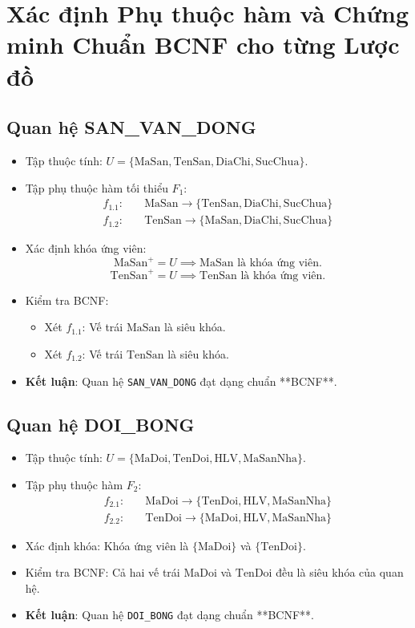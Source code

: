 \section{Xác định Phụ thuộc hàm và Chứng minh Chuẩn BCNF cho từng Lược đồ}

\subsection{Quan hệ SAN\_VAN\_DONG}
\begin{itemize}
    \item Tập thuộc tính: $U = \{\text{MaSan}, \text{TenSan}, \text{DiaChi}, \text{SucChua}\}$.
    \item Tập phụ thuộc hàm tối thiểu $F_1$:
    \begin{align*}
        f_{1.1}: & \quad \text{MaSan} \rightarrow \{\text{TenSan}, \text{DiaChi}, \text{SucChua}\} \\
        f_{1.2}: & \quad \text{TenSan} \rightarrow \{\text{MaSan}, \text{DiaChi}, \text{SucChua}\}
    \end{align*}
    \item Xác định khóa ứng viên:
    $$\text{MaSan}^+ = U \implies \text{MaSan} \text{ là khóa ứng viên.}$$
    $$\text{TenSan}^+ = U \implies \text{TenSan} \text{ là khóa ứng viên.}$$
    \item Kiểm tra BCNF:
    \begin{itemize}
        \item Xét $f_{1.1}$: Vế trái $\text{MaSan}$ là siêu khóa.
        \item Xét $f_{1.2}$: Vế trái $\text{TenSan}$ là siêu khóa.
    \end{itemize}
    \item \textbf{Kết luận}: Quan hệ \texttt{SAN\_VAN\_DONG} đạt dạng chuẩn **BCNF**.
\end{itemize}

\subsection{Quan hệ DOI\_BONG}
\begin{itemize}
    \item Tập thuộc tính: $U = \{\text{MaDoi}, \text{TenDoi}, \text{HLV}, \text{MaSanNha}\}$.
    \item Tập phụ thuộc hàm $F_2$:
    \begin{align*}
        f_{2.1}: & \quad \text{MaDoi} \rightarrow \{\text{TenDoi}, \text{HLV}, \text{MaSanNha}\} \\
        f_{2.2}: & \quad \text{TenDoi} \rightarrow \{\text{MaDoi}, \text{HLV}, \text{MaSanNha}\}
    \end{align*}
    \item Xác định khóa: Khóa ứng viên là $\{\text{MaDoi}\}$ và $\{\text{TenDoi}\}$.
    \item Kiểm tra BCNF: Cả hai vế trái $\text{MaDoi}$ và $\text{TenDoi}$ đều là siêu khóa của quan hệ.
    \item \textbf{Kết luận}: Quan hệ \texttt{DOI\_BONG} đạt dạng chuẩn **BCNF**.
\end{itemize}


